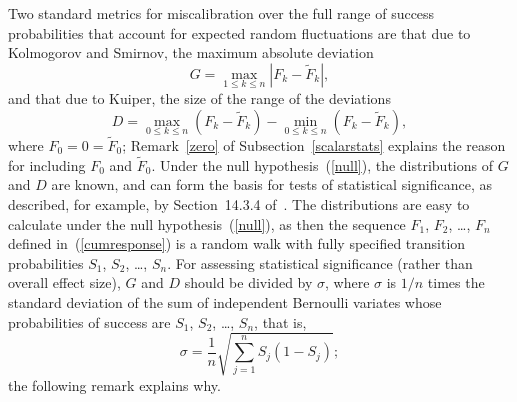 \documentclass{article}
\begin{document}
Two standard metrics for miscalibration over the full range
of success probabilities that account for expected random fluctuations
are that due to Kolmogorov and Smirnov, the maximum absolute deviation
%
\begin{equation}
G = \max_{1 \le k \le n} |F_k-\tilde{F}_k|,
\end{equation}
%
and that due to Kuiper, the size of the range of the deviations
%
\begin{equation}
D = \max_{0 \le k \le n} (F_k-\tilde{F}_k)
  - \min_{0 \le k \le n} (F_k-\tilde{F}_k),
\end{equation}
%
where $F_0 = 0 = \tilde{F}_0$; Remark~\ref{zero}
of Subsection~\ref{scalarstats}
explains the reason for including $F_0$ and $\tilde{F}_0$.
Under the null hypothesis~(\ref{null}),
the distributions of $G$ and $D$ are known,
and can form the basis for tests of statistical significance,
as described, for example,
by Section~14.3.4 of~\cite{press-teukolsky-vetterling-flannery}.
The distributions are easy to calculate under the null hypothesis~(\ref{null}),
as then the sequence $F_1$, $F_2$, \dots, $F_n$ defined in~(\ref{cumresponse})
is a random walk with fully specified transition probabilities
$S_1$, $S_2$, \dots, $S_n$.
For assessing statistical significance (rather than overall effect size),
$G$ and $D$ should be divided by $\sigma$,
where $\sigma$ is $1/n$ times the standard deviation
of the sum of independent Bernoulli variates whose probabilities of success
are $S_1$, $S_2$, \dots, $S_n$, that is,
%
\begin{equation}
\sigma = \frac{1}{n} \sqrt{\sum_{j=1}^n S_j (1-S_j)};
\end{equation}
%
the following remark explains why.
\end{document}
